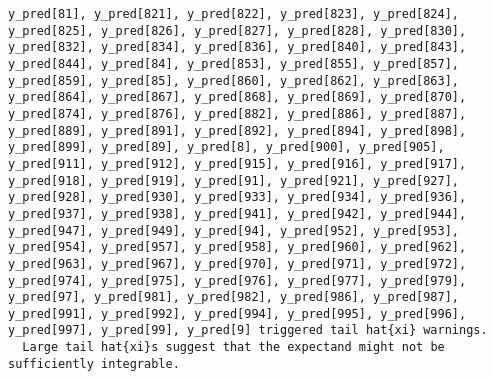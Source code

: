 \documentclass[
  letterpaper,
  DIV=11,
  numbers=noendperiod]{scrartcl}
\begin{document}
\begin{verbatim}
y_pred[81], y_pred[821], y_pred[822], y_pred[823], y_pred[824],
y_pred[825], y_pred[826], y_pred[827], y_pred[828], y_pred[830],
y_pred[832], y_pred[834], y_pred[836], y_pred[840], y_pred[843],
y_pred[844], y_pred[84], y_pred[853], y_pred[855], y_pred[857],
y_pred[859], y_pred[85], y_pred[860], y_pred[862], y_pred[863],
y_pred[864], y_pred[867], y_pred[868], y_pred[869], y_pred[870],
y_pred[874], y_pred[876], y_pred[882], y_pred[886], y_pred[887],
y_pred[889], y_pred[891], y_pred[892], y_pred[894], y_pred[898],
y_pred[899], y_pred[89], y_pred[8], y_pred[900], y_pred[905],
y_pred[911], y_pred[912], y_pred[915], y_pred[916], y_pred[917],
y_pred[918], y_pred[919], y_pred[91], y_pred[921], y_pred[927],
y_pred[928], y_pred[930], y_pred[933], y_pred[934], y_pred[936],
y_pred[937], y_pred[938], y_pred[941], y_pred[942], y_pred[944],
y_pred[947], y_pred[949], y_pred[94], y_pred[952], y_pred[953],
y_pred[954], y_pred[957], y_pred[958], y_pred[960], y_pred[962],
y_pred[963], y_pred[967], y_pred[970], y_pred[971], y_pred[972],
y_pred[974], y_pred[975], y_pred[976], y_pred[977], y_pred[979],
y_pred[97], y_pred[981], y_pred[982], y_pred[986], y_pred[987],
y_pred[991], y_pred[992], y_pred[994], y_pred[995], y_pred[996],
y_pred[997], y_pred[99], y_pred[9] triggered tail hat{xi} warnings.
  Large tail hat{xi}s suggest that the expectand might not be
sufficiently integrable.
 

\end{verbatim}
\end{document}
